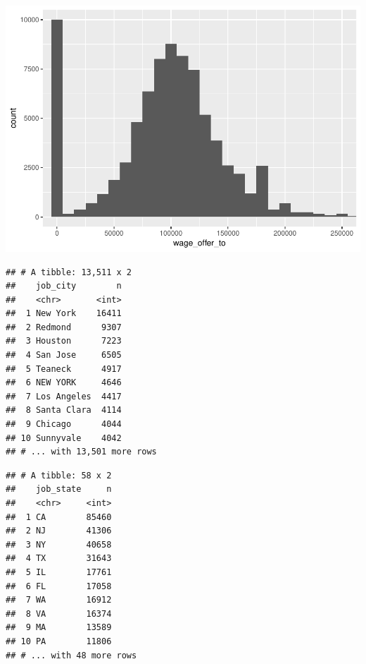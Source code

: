 \documentclass[]{article}
\newenvironment{Shaded}{\begin{snugshade}}{\end{snugshade}}
\newcommand{\KeywordTok}[1]{\textcolor[rgb]{0.13,0.29,0.53}{\textbf{#1}}}
\newcommand{\DataTypeTok}[1]{\textcolor[rgb]{0.13,0.29,0.53}{#1}}
\newcommand{\StringTok}[1]{\textcolor[rgb]{0.31,0.60,0.02}{#1}}
\newcommand{\CommentTok}[1]{\textcolor[rgb]{0.56,0.35,0.01}{\textit{#1}}}
\newcommand{\OperatorTok}[1]{\textcolor[rgb]{0.81,0.36,0.00}{\textbf{#1}}}
\newcommand{\NormalTok}[1]{#1}
\begin{document}
\includegraphics{Report_Dummy_files/figure-latex/variable-specific exploratory data analysis-4.pdf}

\begin{Shaded}
\end{Shaded}

\begin{verbatim}
## # A tibble: 13,511 x 2
##    job_city        n
##    <chr>       <int>
##  1 New York    16411
##  2 Redmond      9307
##  3 Houston      7223
##  4 San Jose     6505
##  5 Teaneck      4917
##  6 NEW YORK     4646
##  7 Los Angeles  4417
##  8 Santa Clara  4114
##  9 Chicago      4044
## 10 Sunnyvale    4042
## # ... with 13,501 more rows
\end{verbatim}

\begin{Shaded}
\end{Shaded}

\begin{verbatim}
## # A tibble: 58 x 2
##    job_state     n
##    <chr>     <int>
##  1 CA        85460
##  2 NJ        41306
##  3 NY        40658
##  4 TX        31643
##  5 IL        17761
##  6 FL        17058
##  7 WA        16912
##  8 VA        16374
##  9 MA        13589
## 10 PA        11806
## # ... with 48 more rows
\end{verbatim}
\end{document}

